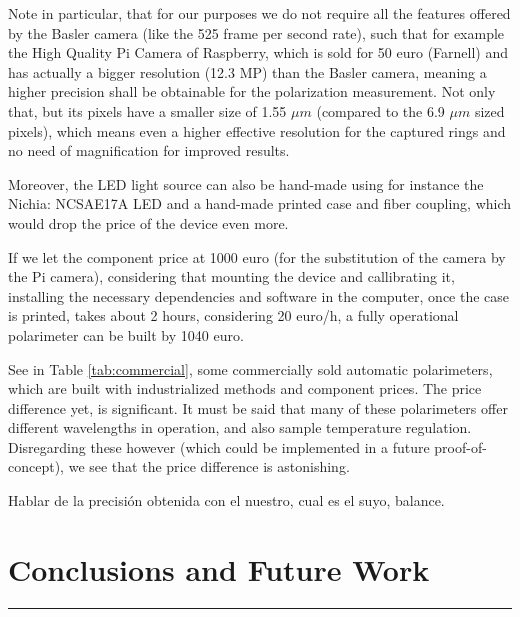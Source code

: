 \documentclass[11pt, a4paper, twoside]{article} %
\begin{document}
Note in particular, that for our purposes we do not require all the features offered by the Basler camera (like the 525 frame per second rate), such that for example the High Quality Pi Camera of Raspberry, which is sold for 50 euro (Farnell) and has actually a bigger resolution (12.3 MP) than the Basler camera, meaning a higher precision shall be obtainable for the polarization measurement. Not only that, but its pixels have a smaller size of 1.55 $\mu m$ (compared to the 6.9 $\mu m$ sized pixels), which means even a higher effective resolution for the captured rings and no need of magnification for improved results.

Moreover, the LED light source can also be hand-made using for instance the Nichia: NCSAE17A LED and a hand-made printed case and fiber coupling, which would drop the price of the device even more.

If we let the component price at 1000 euro (for the substitution of the camera by the Pi camera), considering that mounting the device and callibrating it, installing the necessary dependencies and software in the computer, once the case is printed, takes about 2 hours, considering 20 euro/h, a fully operational polarimeter can be built by 1040 euro.

See in Table \ref{tab:commercial}, some commercially sold automatic polarimeters, which are built with industrialized methods and component prices. The price difference yet, is significant. It must be said that many of these polarimeters offer different wavelengths in operation, and also sample temperature regulation. Disregarding these however (which could be implemented in a future proof-of-concept), we see that the price difference is astonishing. 

Hablar de la precisión obtenida con el nuestro, cual es el suyo, balance.
 









\newpage
\fancyhead[L]{\null}
\fancyhead[R]{\null}











\section*{\centering \huge{ Conclusions and Future Work}\vspace{-0.3cm}}
\noindent\rule{\textwidth}{0.4pt}
\end{document}
